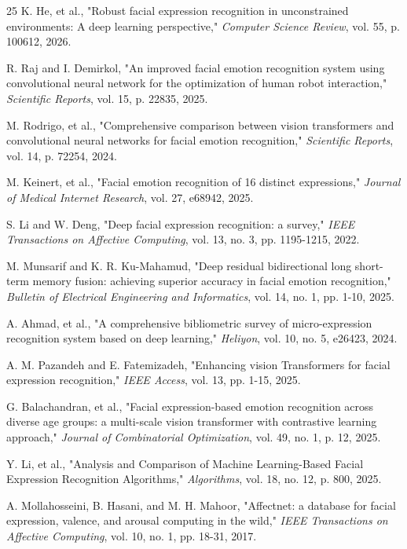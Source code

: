 \documentclass[journal]{IEEEtran}
\begin{document}
\begin{thebibliography}{25}
K. He, et al., "Robust facial expression recognition in unconstrained environments: A deep learning perspective," \textit{Computer Science Review}, vol. 55, p. 100612, 2026.

R. Raj and I. Demirkol, "An improved facial emotion recognition system using convolutional neural network for the optimization of human robot interaction," \textit{Scientific Reports}, vol. 15, p. 22835, 2025.

M. Rodrigo, et al., "Comprehensive comparison between vision transformers and convolutional neural networks for facial emotion recognition," \textit{Scientific Reports}, vol. 14, p. 72254, 2024.

M. Keinert, et al., "Facial emotion recognition of 16 distinct expressions," \textit{Journal of Medical Internet Research}, vol. 27, e68942, 2025.

S. Li and W. Deng, "Deep facial expression recognition: a survey," \textit{IEEE Transactions on Affective Computing}, vol. 13, no. 3, pp. 1195-1215, 2022.

M. Munsarif and K. R. Ku-Mahamud, "Deep residual bidirectional long short-term memory fusion: achieving superior accuracy in facial emotion recognition," \textit{Bulletin of Electrical Engineering and Informatics}, vol. 14, no. 1, pp. 1-10, 2025.

A. Ahmad, et al., "A comprehensive bibliometric survey of micro-expression recognition system based on deep learning," \textit{Heliyon}, vol. 10, no. 5, e26423, 2024.

A. M. Pazandeh and E. Fatemizadeh, "Enhancing vision Transformers for facial expression recognition," \textit{IEEE Access}, vol. 13, pp. 1-15, 2025.

G. Balachandran, et al., "Facial expression-based emotion recognition across diverse age groups: a multi-scale vision transformer with contrastive learning approach," \textit{Journal of Combinatorial Optimization}, vol. 49, no. 1, p. 12, 2025.

Y. Li, et al., "Analysis and Comparison of Machine Learning-Based Facial Expression Recognition Algorithms," \textit{Algorithms}, vol. 18, no. 12, p. 800, 2025.

A. Mollahosseini, B. Hasani, and M. H. Mahoor, "Affectnet: a database for facial expression, valence, and arousal computing in the wild," \textit{IEEE Transactions on Affective Computing}, vol. 10, no. 1, pp. 18-31, 2017.


\end{thebibliography}
\end{document}
